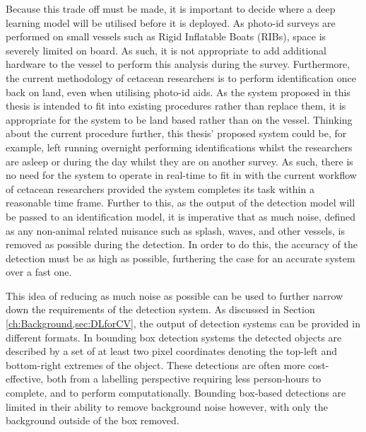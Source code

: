  Because this trade off must be made, it is important to decide where a deep learning model will be utilised before it is deployed. As photo-id surveys are performed on small vessels such as Rigid Inflatable Boats (RIBs), space is severely limited on board. As such, it is not appropriate to add additional hardware to the vessel to perform this analysis during the survey. Furthermore, the current methodology of cetacean researchers is to perform identification once back on land, even when utilising photo-id aids. As the system proposed in this thesis is intended to fit into existing procedures rather than replace them, it is appropriate for the system to be land based rather than on the vessel. Thinking about the current procedure further, this thesis' proposed system could be, for example, left running overnight performing identifications whilst the researchers are asleep or during the day whilst they are on another survey. As such, there is no need for the system to operate in real-time to fit in with the current workflow of cetacean researchers provided the system completes its task within a reasonable time frame. Further to this, as the output of the detection model will be passed to an identification model, it is imperative that as much noise, defined as any non-animal related nuisance such as splash, waves, and other vessels, is removed as possible during the detection. In order to do this, the accuracy of the detection must be as high as possible, furthering the case for an accurate system over a fast one.
 
 This idea of reducing as much noise as possible can be used to further narrow down the requirements of the detection system. As discussed in Section \ref{ch:Background,sec:DLforCV}, the output of detection systems can be provided in different formats. In bounding box detection systems the detected objects are described by a set of at least two pixel coordinates denoting the top-left and bottom-right extremes of the object. These detections are often more cost-effective, both from a labelling perspective requiring less person-hours to complete, and to perform computationally. Bounding box-based detections are limited in their ability to remove background noise however, with only the background outside of the box removed.
 
